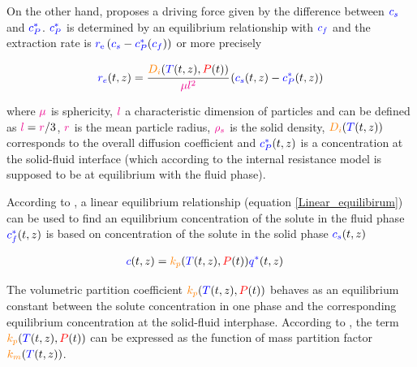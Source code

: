 \documentclass[../Article_Model_Parameters.tex]{subfiles}
\begin{document}
		On the other hand, \citet{Reverchon1996} proposes a driving force given by the difference between ${\color{blue}c_s}$ and ${\color{blue}c_P^*}$. ${\color{blue}c_P^*}$ is determined by an equilibrium relationship with ${\color{blue}c_f}$ and the extraction rate is ${\color{blue}r_\text{e}}\left({\color{blue}c_s} - {\color{blue}c^*_P}({\color{blue}c_f})\right)$ or more precisely
			
			{\footnotesize
				\begin{equation} \label{Model_kinetic_basic}
					{\color{blue}r_e}(t,z) = \cfrac{{\color{orange}D_i}({\color{blue}T}(t,z), {\color{red}P}(t))}{{\color{magenta} \mu l^2} }\left({\color{blue}c_s}(t,z) - {\color{blue}c_P^*}(t,z) \right)
			\end{equation} }
			
		where ${\color{magenta}\mu}$ is sphericity, ${\color{magenta}l}$ a characteristic dimension of particles and can be defined as ${\color{magenta}l} = {\color{magenta}r}/3$, ${\color{magenta}r}$ is the mean particle radius, ${\color{magenta}\rho_s}$ is the solid density, ${\color{orange}D_i}({\color{blue}T}(t,z))$ corresponds to the overall diffusion coefficient and ${\color{blue}c_P^*}(t,z)$ is a concentration at the solid-fluid interface (which according to the internal resistance model is supposed to be at equilibrium with the fluid phase). 
			
		According to \citet{Bulley1984}, a linear equilibrium relationship (equation  \ref{Linear_equilibirum}) can be used to find an equilibrium concentration of the solute in the fluid phase ${\color{blue}c_f^*}(t,z)$ is based on concentration of the solute in the solid phase ${\color{blue}c_s}(t,z)$ 
			
			{\footnotesize
				\begin{align} \label{Linear_equilibirum}
					{\color{blue}c}(t,z) &= {\color{orange}k_p}({\color{blue}T}(t,z),{\color{red}P}(t)) \allowbreak {\color{blue}q^*}(t,z)
			\end{align} }
			
			The volumetric partition coefficient ${\color{orange}k_p}({\color{blue}T}(t,z),{\color{red}P}(t))$ behaves as an equilibrium constant between the solute concentration in one phase and the corresponding equilibrium concentration at the solid-fluid interphase. According to \citet{Spiro2007}, the term ${\color{orange}k_p}({\color{blue}T}(t,z),{\color{red}P}(t))$ can be expressed as the function of mass partition factor ${\color{orange}k_m}({\color{blue}T}(t,z))$.
			
\end{document}
